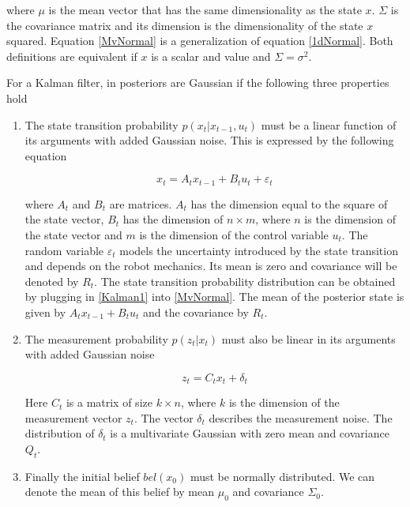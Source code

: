 \documentclass[conference]{IEEEtran}
\begin{document}
where $\mu$ is the mean vector that has the same dimensionality as the state $x$. $\Sigma$ is the covariance matrix and its dimension is the dimensionality of the state $x$ squared. Equation \ref{MvNormal} is a generalization of equation \ref{1dNormal}. Both definitions are equivalent if $x$ is a scalar and value and $\Sigma = \sigma ^ 2$.

For a Kalman filter, in posteriors are Gaussian if the following three properties hold\\

\begin{enumerate}
\item The state transition probability $p(x_t|x_{t-1}, u_t)$ must be a linear function of its arguments with added Gaussian noise. This is expressed by the following equation

 \begin{equation}\label{Kalman1}
x_t = A_tx_{t-1} + B_tu_t + \varepsilon_t
\end{equation}

where $A_t$ and $B_t$ are matrices. $A_t$ has the dimension equal to the square of the state vector, $B_t$ has the dimension of $n \times m$, where $n$ is the dimension of the state vector and $m$ is the dimension of the control variable $u_t$. The random variable $\varepsilon_t$ models the uncertainty introduced by the state transition and depends on the robot mechanics. Its mean is zero and covariance will be denoted by $R_t$. The state transition probability distribution can be obtained by plugging in \ref{Kalman1} into \ref{MvNormal}. The mean of the posterior state is given by $A_tx_{t-1} + B_tu_t$ and the covariance by $R_t$.\\

\item The measurement probability $p(z_t|x_t)$ must also be linear in its arguments with added Gaussian noise

 \begin{equation}\label{Kalman2}
z_t = C_tx_{t} + \delta_t
\end{equation}

Here $C_t$ is a matrix of size $k \times n$, where $k$ is the dimension of the measurement vector $z_t$. The vector $\delta_t$ describes the measurement noise. The distribution of $\delta_t$ is a multivariate Gaussian with zero mean and covariance $Q_t$.\\

\item Finally the initial belief $bel(x_0)$ must be normally distributed. We can denote the mean of this belief by mean $\mu_0$ and covariance $\Sigma_0$.\\
\end{enumerate}
\end{document}

